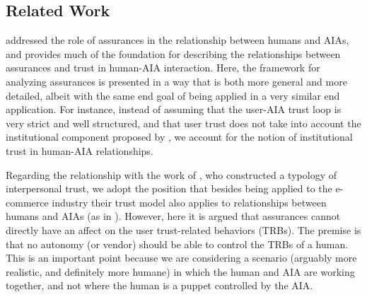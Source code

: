 \subsection{Related Work}\label{sec:rel_work}
    \citet{Lillard2016-yg} addressed the role of assurances in the relationship between humans and AIAs, and provides much of the foundation for describing the relationships between assurances and trust in human-AIA interaction. Here, the framework for analyzing assurances is presented in a way that is both more general and more detailed, albeit with the same end goal of being applied in a very similar end application. For instance, instead of assuming that the user-AIA trust loop is very strict and well structured, and that user trust does not take into account the institutional component proposed by \citet{McKnight2001-fa}, we account for the notion of institutional trust in  human-AIA relationships.

    Regarding the relationship with the work of \citet{McKnight2001-fa}, who constructed a typology of interpersonal trust,  we adopt the position that besides being applied to the e-commerce industry their trust model also applies to relationships between humans and AIAs (as in \citet{Lillard2016-yg}). However, here it is argued that assurances cannot directly have an affect on the user trust-related behaviors (TRBs). The premise is that no autonomy (or vendor) should be able to control the TRBs of a human. This is an important point because we are considering a scenario (arguably more realistic, and definitely more humane) in which the human and AIA are working together, and not where the human is a puppet controlled by the AIA.





